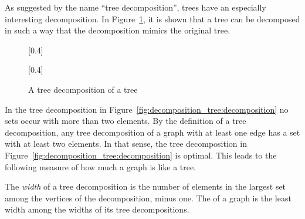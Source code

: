 As suggested by the name \enquote{tree decomposition}, trees have an especially interesting decomposition.
In Figure~\ref{fig:decomposition_tree}, it is shown that a tree can be decomposed in such a way that the decomposition mimics the original tree.
\begin{figure}
  \centering
  [0.4\textwidth]{
  }
  \qquad
  [0.4\textwidth]{
  }
  \caption{
    A tree decomposition of a tree
  }
  \label{fig:decomposition_tree}
\end{figure}
In the tree decomposition in Figure~\ref{fig:decomposition_tree:decomposition} no sets occur with more than two elements.
By the definition of a tree decomposition, any tree decomposition of a graph with at least one edge has a set with at least two elements.
In that sense, the tree decomposition in Figure~\ref{fig:decomposition_tree:decomposition} is optimal.
This leads to the following measure of how much a graph is like a tree.
\begin{definition}
  The \emph{width} of a tree decomposition is the number of elements in the largest set among the vertices of the decomposition, minus one.
  The  of a graph is the least width among the widths of its tree decompositions.
\end{definition}

